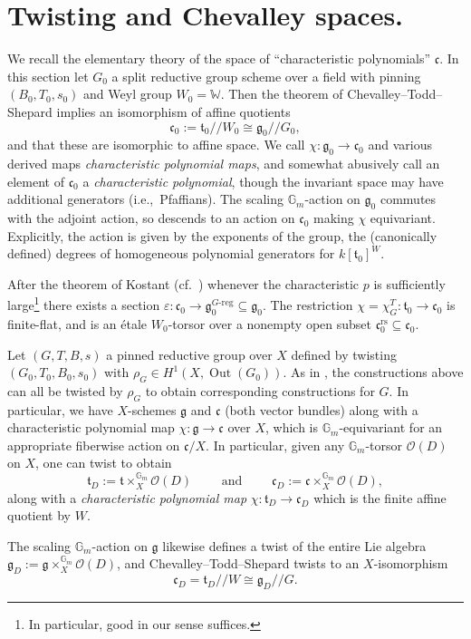 \documentclass[openany]{amsbook}
\theoremstyle{definition}
\theoremstyle{remark}
\numberwithin{equation}{section}
\newcommand{\G}{\mathbb{G}}
\newcommand{\W}{\mathbb{W}}
\renewcommand{\O}{\mathcal{O}}
\renewcommand{\-}{\operatorname{-}}
\newcommand{\Out}{\operatorname{Out}}
\newcommand{\on}[1]{\operatorname{#1}}
\newcommand{\rs}{\on{rs}}
\newcommand{\ft}{\mathfrak{t}}
\newcommand{\fc}{\mathfrak{c}}
\renewcommand{\fg}{\mathfrak{g}}
\newcommand{\Greg}{G\text{-reg}}
\newcommand{\gitq}{/\!/}
\begin{document}
\section{Twisting and Chevalley spaces.}\label{subsect.twist.chevalley} We recall the elementary theory of the space of ``characteristic polynomials'' $\fc$. In this section let $G_0$ a split reductive group scheme over a field with pinning $(B_0,T_0,s_0)$ and Weyl group $W_0 = \W$. Then the theorem of Chevalley--Todd--Shepard implies an isomorphism of affine quotients
\[
    \fc_0 := \ft_0\gitq W_0 \cong \fg_0\gitq G_0,
\]
and that these are isomorphic to affine space. We call $\chi : \fg_0 \to \fc_0$ and various derived maps \textit{characteristic polynomial maps}, and somewhat abusively call an element of $\fc_0$ a \textit{characteristic polynomial}, though the invariant space may have additional generators (i.e.,\ Pfaffians). The scaling $\G_m$-action on $\fg_0$ commutes with the adjoint action, so descends to an action on $\fc_0$ making $\chi$ equivariant. Explicitly, the action is given by the exponents of the group, the (canonically defined) degrees of homogeneous polynomial generators for $k[\ft_0]^W$.

After the theorem of Kostant (cf.\ \cite{bouthierprodform}) whenever the characteristic $p$ is sufficiently large\footnote{In particular, good in our sense suffices.} there exists a section $\varepsilon : \fc_0 \to \fg_0^{\Greg} \subseteq \fg_0$. The restriction $\chi = \chi^T_G : \ft_0 \to \fc_0$ is finite-flat, and is an \'etale $W_0$-torsor over a nonempty open subset $\fc_0^{\rs} \subseteq \fc_0$. 

Let $(G, T, B, s)$ a pinned reductive group over $X$ defined by twisting $(G_0, T_0, B_0, s_0)$ with $\rho_G \in H^1(X, \Out(G_0))$. As in \cite[]{ngofl}, the constructions above can all be twisted by $\rho_G$ to obtain corresponding constructions for $G$. In particular, we have $X$-schemes $\fg$ and $\fc$ (both vector bundles) along with a characteristic polynomial map $\chi : \fg \to \fc$ over $X$, which is $\G_m$-equivariant for an appropriate fiberwise action on $\fc/X$. In particular, given any $\G_m$-torsor $\O(D)$ on $X$, one can twist to obtain
    \[
        \ft_{D} := \ft \times^{\G_m}_X \O(D) \qquad \text{ and } \qquad \fc_{D} := \fc \times^{\G_m}_X \O(D),
    \]
    along with a \emph{characteristic polynomial map} $\chi : \ft_{D} \to \fc_{D}$ which is the finite affine quotient by $W$.

    The scaling $\G_m$-action on $\fg$ likewise defines a twist of the entire Lie algebra $\fg_D := \fg \times^{\G_m}_X \O(D)$, and Chevalley--Todd--Shepard twists to an $X$-isomorphism
    $$
        \fc_D = \ft_D\gitq W \cong \fg_D\gitq G.
    $$
\end{document}

